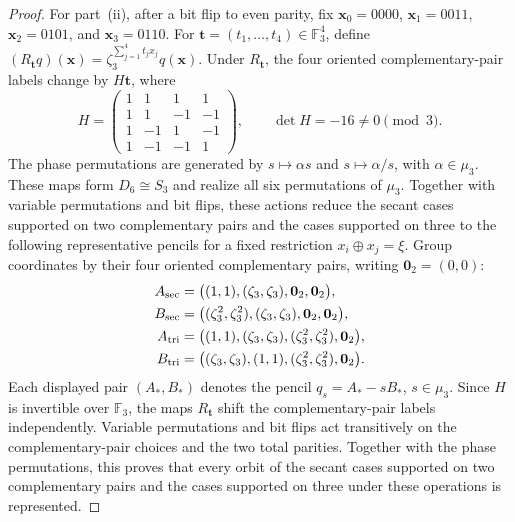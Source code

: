 \documentclass[11pt,letterpaper,onecolumn]{article}
\theoremstyle{plain}
\theoremstyle{definition}
\theoremstyle{remark}
\begin{document}
\begin{proof}
		For part~\textnormal{(ii)}, after a bit flip to even parity, fix
		\({\mathbf x}_0=0000\), \({\mathbf x}_1=0011\), \({\mathbf x}_2=0101\), and \({\mathbf x}_3=0110\).  For
		\({\mathbf t}=(t_1,\ldots,t_4)\in\mathbb F_3^4\), define
		\((R_{\mathbf t}q)({\mathbf x})=\zeta_3^{\sum_{j=1}^4t_jx_j}q({\mathbf x})\).  Under \(R_{\mathbf t}\),
		the four oriented complementary-pair labels change by \(H{\mathbf t}\),
		where
		\[
		H=
		\begin{pmatrix}
			1&1&1&1\\
			1&1&-1&-1\\
			1&-1&1&-1\\
			1&-1&-1&1
		\end{pmatrix},
		\qquad
		\det H=-16\ne0\pmod3.
		\]
		The phase permutations are generated by \(s\mapsto\alpha s\) and
		\(s\mapsto\alpha/s\), with
		\(\alpha\in\mu_3\). These maps form \(D_6\cong S_3\) and realize all six
		permutations of \(\mu_3\).  Together with variable permutations and bit flips,
		these actions reduce the secant cases supported on two complementary pairs and the cases supported on three to the following
		representative pencils for a fixed restriction \(x_i\oplus x_j=\xi\).
        Group coordinates by their four oriented complementary pairs,
        writing \(\mathbf0_2=(0,0)\):
        \begin{align*}
        A_{\rm sec}&=\bigl((1,1),(\zeta_3,\zeta_3),\mathbf0_2,\mathbf0_2\bigr),\\
        B_{\rm sec}&=\bigl((\zeta_3^2,\zeta_3^2),(\zeta_3,\zeta_3),\mathbf0_2,\mathbf0_2\bigr),\\
        A_{\rm tri}&=\bigl((1,1),(\zeta_3,\zeta_3),(\zeta_3^2,\zeta_3^2),\mathbf0_2\bigr),\\
        B_{\rm tri}&=\bigl((\zeta_3,\zeta_3),(1,1),(\zeta_3^2,\zeta_3^2),\mathbf0_2\bigr).
        \end{align*}
		Each displayed pair \((A_*,B_*)\) denotes the pencil
		\(q_s=A_*-sB_*\), \(s\in\mu_3\).
		Since \(H\) is invertible over \(\mathbb F_3\), the maps \(R_{\mathbf t}\) shift the
		complementary-pair labels independently.  Variable permutations and bit flips act transitively
		on the complementary-pair choices and the two total parities.  Together with the phase permutations, this proves that every orbit of
		the secant cases supported on two complementary pairs and the cases supported on three under these operations is
		represented.
		

\end{proof}
\end{document}
